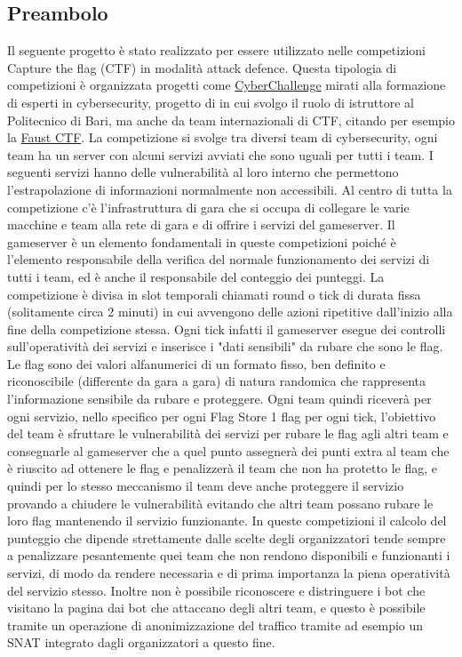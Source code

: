 \documentclass[11pt]{article}
\begin{document}
\subsection{Preambolo}
	Il seguente progetto è stato realizzato per essere utilizzato nelle competizioni Capture the flag (CTF) in modalità attack defence. Questa tipologia di competizioni è organizzata progetti come \href{https://cyberchallenge.it/}{CyberChallenge} mirati alla formazione di esperti in cybersecurity, progetto di in cui svolgo il ruolo di istruttore al Politecnico di Bari, ma anche da team internazionali di CTF, citando per esempio la \href{https://2024.faustctf.net/}{Faust CTF}. La competizione si svolge tra diversi team di cybersecurity, ogni team ha un server con alcuni servizi avviati che sono uguali per tutti i team. I seguenti servizi hanno delle vulnerabilità al loro interno che permettono l'estrapolazione di informazioni normalmente non accessibili. Al centro di tutta la competizione c'è l'infrastruttura di gara che si occupa di collegare le varie macchine e team alla rete di gara e di offrire i servizi del gameserver. Il gameserver è un elemento fondamentali in queste competizioni poiché è l'elemento responsabile della verifica del normale funzionamento dei servizi di tutti i team, ed è anche il responsabile del conteggio dei punteggi. La competizione è divisa in slot temporali chiamati round o tick di durata fissa (solitamente circa 2 minuti) in cui avvengono delle azioni ripetitive dall'inizio alla fine della competizione stessa. Ogni tick infatti il gameserver esegue dei controlli sull'operatività dei servizi e inserisce i "dati sensibili" da rubare che sono le flag. Le flag sono dei valori alfanumerici di un formato fisso, ben definito e riconoscibile (differente da gara a gara) di natura randomica che rappresenta l'informazione sensibile da rubare e proteggere. Ogni team quindi riceverà per ogni servizio, nello specifico per ogni Flag Store 1 flag per ogni tick, l'obiettivo del team è sfruttare le vulnerabilità dei servizi per rubare le flag agli altri team e consegnarle al gameserver che a quel punto assegnerà dei punti extra al team che è riuscito ad ottenere le flag e penalizzerà il team che non ha protetto le flag, e quindi per lo stesso meccanismo il team deve anche proteggere il servizio provando a chiudere le vulnerabilità evitando che altri team possano rubare le loro flag mantenendo il servizio funzionante. In queste competizioni il calcolo del punteggio che dipende strettamente dalle scelte degli organizzatori tende sempre a penalizzare pesantemente quei team che non rendono disponibili e funzionanti i servizi, di modo da rendere necessaria e di prima importanza la piena operatività del servizio stesso. Inoltre non è possibile riconoscere e distringuere i bot che visitano la pagina dai bot che attaccano degli altri team, e questo è possibile tramite un operazione di anonimizzazione del traffico tramite ad esempio un SNAT integrato dagli organizzatori a questo fine.
\end{document}
